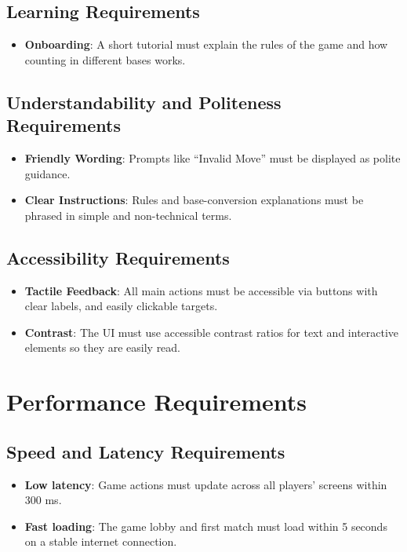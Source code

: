 \documentclass[12pt]{article}
\begin{document}
\subsection{Learning Requirements}
	\begin{itemize}
		\item \textbf{Onboarding}: A short tutorial must explain the rules of the game and how counting in different bases works.
	\end{itemize}
\subsection{Understandability and Politeness Requirements}
	\begin{itemize}
		\item \textbf{Friendly Wording}: Prompts like “Invalid Move” must be displayed as polite guidance.
		\item \textbf{Clear Instructions}: Rules and base-conversion explanations must be phrased in simple and non-technical terms.
	\end{itemize}
\subsection{Accessibility Requirements}
	\begin{itemize}
		\item \textbf{Tactile Feedback}: All main actions must be accessible via buttons with clear labels, and easily clickable targets.
		\item \textbf{Contrast}: The UI must use accessible contrast ratios for text and interactive elements so they are easily read.
	\end{itemize}

\section{Performance Requirements}
\subsection{Speed and Latency Requirements}
	\begin{itemize}
		\item\textbf{Low latency}: Game actions must update across all players’ screens within 300 ms.
		\item \textbf{Fast loading}: The game lobby and first match must load within 5 seconds on a stable internet connection.
	\end{itemize}
\end{document}

